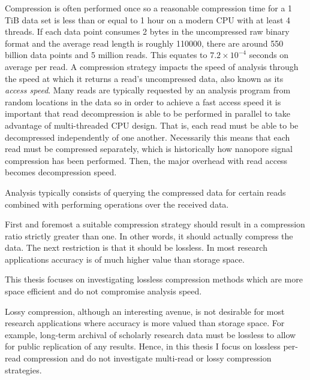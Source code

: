 

Compression is often performed once so a reasonable compression time for a 1 TiB data set is less than or equal to 1 hour on a modern CPU with at least 4 threads.
If each data point consumes 2 bytes in the uncompressed raw binary format and the average read length is roughly \num{110000}, there are around 550 billion data points and 5 million reads. This equates to $7.2\times 10^{-4}$ seconds on average per read. A compression strategy impacts the speed of analysis through the speed at which it returns a read's uncompressed data, also known as its \textit{access speed}. Many reads are typically requested by an analysis program from random locations in the data so in order to achieve a fast access speed it is important that read decompression is able to be performed in parallel to take advantage of multi-threaded CPU design. That is, each read must be able to be decompressed independently of one another. Necessarily this means that each read must be compressed separately, which is historically how nanopore signal compression has been performed. Then, the major overhead with read access becomes decompression speed.

Analysis typically consists of querying the compressed data for certain reads combined with performing operations over the received data.

First and foremost a suitable compression strategy should result in a compression ratio strictly greater than one. In other words, it should actually compress the data.
The next restriction is that it should be lossless. In most research applications accuracy is of much higher value than storage space.

This thesis focuses on investigating lossless compression methods which are more space efficient and do not compromise analysis speed.


Lossy compression, although an interesting avenue, is not desirable for most research applications where accuracy is more valued than storage space. For example, long-term archival of scholarly research data must be lossless to allow for public replication of any results.
Hence, in this thesis I focus on lossless per-read compression and do not investigate multi-read or lossy compression strategies.
